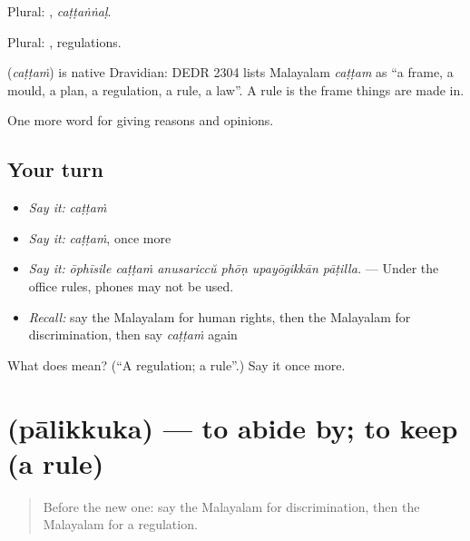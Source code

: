 Plural: , \emph{caṭṭaṅṅaḷ}.

Plural: , regulations.

\begin{cousinweb}
\textbf{} (\emph{caṭṭaṁ}) is native Dravidian: DEDR 2304 lists Malayalam \emph{caṭṭam} as \textquotedblleft{}a frame, a mould, a plan, a regulation, a rule, a law\textquotedblright{}. A rule is the frame things are made in.
\end{cousinweb}

\begin{grammarlens}[title={What you've built}]
One more word for giving reasons and opinions.
\end{grammarlens}

\subsection*{Your turn}
\begin{itemize}
\raggedright
  \item \emph{Say it:} \emph{caṭṭaṁ}
  \item \emph{Say it:} \emph{caṭṭaṁ}, once more
  \item \emph{Say it:} \emph{ōphīsile caṭṭaṁ anusariccŭ phōṇ upayōgikkān pāṭilla.} — Under the office rules, phones may not be used.
  \item \emph{Recall:} say the Malayalam for human rights, then the Malayalam for discrimination, then say \emph{caṭṭaṁ} again
\end{itemize}

\begin{tcolorbox}[breakable,colback=teal!4,colframe=teal!35!black,title={Before you move on}]
What does  mean? (\textquotedblleft{}A regulation; a rule\textquotedblright{}.) Say it once more.
\end{tcolorbox}
\section[\texorpdfstring{\ml{പാലിക്കുക} (pālikkuka)}{പാലിക്കുക (pālikkuka)}]{ (pālikkuka) — to abide by; to keep (a rule)}

\label{lesson:ML-C417-palikkuka}



\begin{quote}
Before the new one: say the Malayalam for discrimination, then the Malayalam for a regulation.
\end{quote}

